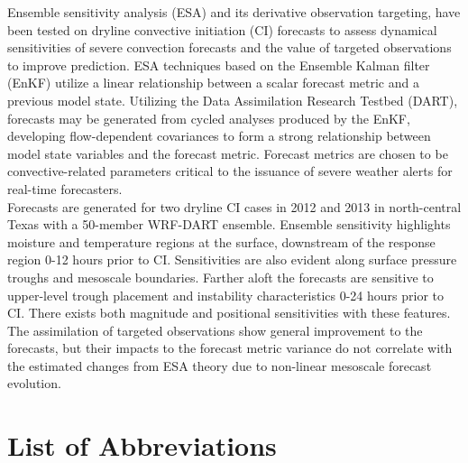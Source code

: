 \documentclass{ttuthes2007}
\newcommand{\tab}{\hspace*{2em}}  %
\begin{document}
\tab Ensemble sensitivity analysis (ESA) and its derivative observation targeting, have been tested on dryline convective initiation (CI) forecasts to assess dynamical sensitivities of severe convection forecasts and the value of targeted observations to improve prediction. ESA techniques based on the Ensemble Kalman filter (EnKF) utilize a linear relationship between a scalar forecast metric and a previous model state. Utilizing the Data Assimilation Research Testbed (DART), forecasts may be generated from cycled analyses produced by the EnKF, developing flow-dependent covariances to form a strong relationship between model state variables and the forecast metric. Forecast metrics are chosen to be convective-related parameters critical to the issuance of severe weather alerts for real-time forecasters. \\

\tab Forecasts are generated for two dryline CI cases in 2012 and 2013 in north-central Texas with a 50-member WRF-DART ensemble. Ensemble sensitivity highlights moisture and temperature regions at the surface, downstream of the response region 0-12 hours prior to CI. Sensitivities are also evident along surface pressure troughs and mesoscale boundaries. Farther aloft the forecasts are sensitive to upper-level trough placement and instability characteristics 0-24 hours prior to CI. There exists both magnitude and positional sensitivities with these features. The assimilation of targeted observations show general improvement to the forecasts, but their impacts to the forecast metric variance do not correlate with the estimated changes from ESA theory due to non-linear mesoscale forecast evolution.



\listoftables

\listoffigures

\chapter{List of Abbreviations}
\end{document}
